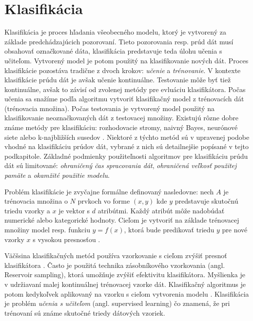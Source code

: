 \section{Klasifikácia}
\label{ulohy-klasifikacia}
Klasifikácia je proces hľadania všeobecného modelu, ktorý je vytvorený za základe predchádzajúcich pozorovaní. Tieto pozorovania resp. prúd dát musí obsahovať označkované dáta, klasifikácia predstavuje teda úlohu učenia s učiteľom. Vytvorený model je potom použitý na klasifikovanie nových dát. Proces klasifikácie pozostáva tradične z dvoch krokov: \textit{učenie} a \textit{trénovanie}. V kontexte klasifikácie prúdu dát je avšak učenie kontinuálne. Testovanie môže byť tiež kontinuálne, avšak to závisí od zvolenej metódy pre evluáciu klasifikátora. Počas učenia sa snažíme podľa algoritmu vytvoriť klasifikačný model z trénovacích dát (trénovacia množina). Počas testovania je vytvorený model použitý na klasifikovanie neoznačkovaných dát z testovacej množiny. Existujú rôzne dobre známe metódy pre klasifikáciu: rozhodovacie stromy, naivný Bayes, neurónové siete alebo k-najbližších susedov \citep{nguyen2015survey}. Niektoré z týchto metód sú v upravenej podobe vhodné na klasifikáciu prúdov dát, vybrané z nich sú detailnejšie popísané v tejto podkapitole. Základné podmienky použiteľnosti algoritmov pre klasifikáciu prúdu dát sú limitované: \textit{ohraničený čas spracovania dát}, \textit{ohraničená veľkosť použitej pamäte} a \textit{okamžité použitie modelu}.
\par
Problém klasifikácie je zvyčajne formálne definovaný nasledovne: nech $A$ je trénovacia množina o $N$ prvkoch vo forme $(x,y)$ kde $y$ predstavuje skutočnú triedu vzorky a $x$ je vektor s $d$ atribútmi. Každý atribút môže nadobúdať numerické alebo kategorické hodnoty. Cieľom je vytvoriť na základe trénovacej množiny model resp. funkciu $y=f(x)$, ktorá bude predikovať triedu $y$ pre nové vzorky $x$ s vysokou presnosťou \citep{domingos2000mining}. 
\par
Väčšsina klasifikačných metód používa vzorkovanie s cieľom zvýšiť presnoť klasifikátora \citep{aggarwal2014survey, nguyen2015survey}. Často je použitá technika zásobníkového vzorkovania (angl. Reservoir sampling), ktorá umožňuje zvýšiť efektivitu klasifikátora. Myšlienka je v udržiavaní malej kontinuálnej trénovacej vzorke dát. Klasifikačný algoritmus je potom kedykoľvek aplikovaný na vzorku s cieľom vytvorenia modelu \citep{aggarwal2014survey}. Klasifikácia je problém \textit{učenia s učiteľom} (angl. supervised learning) čo znamená, že pri trénovaní sú známe skutočné triedy dátových vzoriek.

